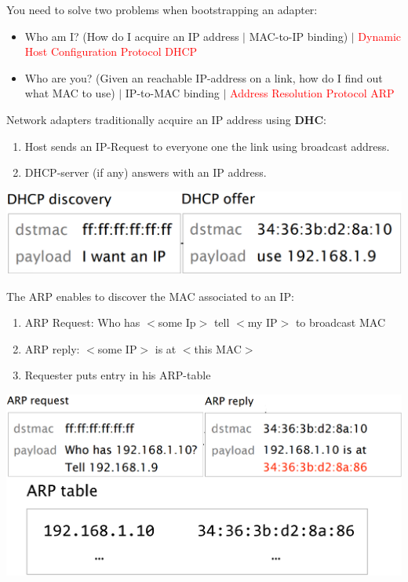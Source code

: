 \documentclass[a4paper, fontsize=8pt, landscape, DIV=1]{scrartcl}
\begin{document}
\begin{multicols*}{4}
\begin{enumerate}[noitemsep]
   			\end{enumerate} 
   			You need to solve two problems when bootstrapping an adapter:
   			\begin{itemize}[noitemsep]
   				\item Who am I? (How do I acquire an IP address $\vert$ MAC-to-IP binding) $\vert$ \textcolor{Red}{Dynamic Host Configuration Protocol DHCP}
   				\item Who are you? (Given an reachable IP-address on a link, how do I find out what MAC to use) $\vert$ IP-to-MAC binding $\vert$ \textcolor{Red}{Address Resolution Protocol ARP}
   			\end{itemize}
   			Network adapters traditionally acquire an IP address using \textbf{DHC}:
   			\begin{enumerate}[noitemsep]
   				\item Host sends an IP-Request to everyone one the link using broadcast address.
   				\item DHCP-server (if any) answers with an IP address. 
   			\end{enumerate}
   			\includegraphics[width=\columnwidth]{images/Link_Layer/DHCP.png}
   			\par 
   			
   			The ARP enables to discover the MAC associated to an IP: 
   			\begin{enumerate}[noitemsep]
   				\item ARP Request: Who has $<$some Ip$>$ tell $<$my IP$>$ to broadcast MAC
   				\item ARP reply: $<$some IP$>$ is at $<$this MAC$>$
   				\item Requester puts entry in his ARP-table
   			\end{enumerate}
   			\includegraphics[width=\columnwidth]{images/Link_Layer/ARP.png}
   			

\end{multicols*}
\end{document}
